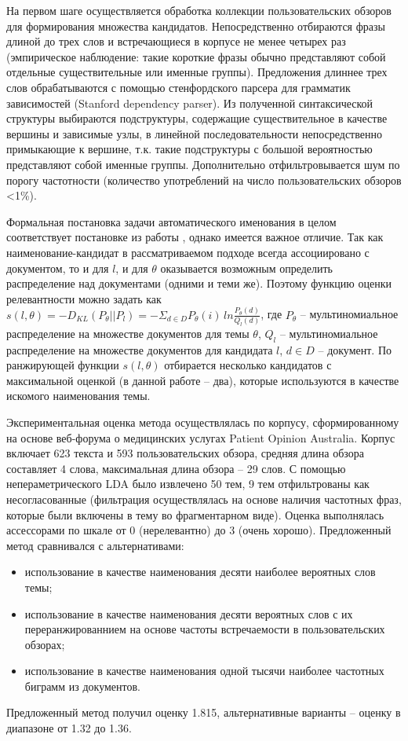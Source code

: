 На первом шаге осуществляется обработка коллекции пользовательских обзоров для формирования множества кандидатов. Непосредственно отбираются фразы длиной до трех слов и встречающиеся в корпусе не менее четырех раз (эмпирическое наблюдение: такие короткие фразы обычно представляют собой отдельные существительные или именные группы). Предложения длиннее трех слов обрабатываются с помощью стенфордского парсера для грамматик зависимостей (Stanford dependency parser). Из полученной синтаксической структуры выбираются подструктуры, содержащие существительное в качестве вершины и зависимые узлы, в линейной последовательности непосредственно примыкающие к вершине, т.к. такие подструктуры с большой вероятностью представляют собой именные группы. Дополнительно отфильтровывается шум по порогу частотности (количество употреблений на число пользовательских обзоров <1\%).

Формальная постановка задачи автоматического именования в целом соответствует постановке из работы \parencite{mei2007automatic}, однако имеется важное отличие. Так как наименование-кандидат в рассматриваемом подходе всегда ассоциировано с документом, то и для $l$, и для $\theta$ оказывается возможным определить распределение над документами (одними и теми же). Поэтому функцию оценки релевантности можно задать как $s(l, \theta) = -D_{KL}(P_\theta||P_l) = -\Sigma_{d \in D}P_\theta(i)\,ln\frac{P_\theta(d)}{Q_l(d)}$, где $P_\theta$ -- мультиномиальное распределение на множестве документов для темы $\theta$, $Q_l$ -- мультиномиальное распределение на множестве документов для кандидата $l$, $d \in D$ -- документ. По ранжирующей функции $s(l, \theta)$ отбирается несколько кандидатов с максимальной оценкой (в данной работе -- два), которые используются в качестве искомого наименования темы.

Экспериментальная оценка метода осуществлялась по корпусу, сформированному на основе веб-форума о медицинских услугах Patient Opinion Australia. Корпус включает 623 текста и 593 пользовательских обзора, средняя длина обзора составляет 4 слова, максимальная длина обзора -- 29 слов. С помощью непераметрического LDA было извлечено 50 тем, 9 тем отфильтрованы как несогласованные (фильтрация осуществлялась на основе наличия частотных фраз, которые были включены в тему во фрагментарном виде). Оценка выполнялась ассессорами по шкале от 0 (нерелевантно) до 3 (очень хорошо). Предложенный метод сравнивался с альтернативами: 
\begin{itemize}
    \item использование в качестве наименования десяти наиболее вероятных слов темы;
    \item использование в качестве наименования десяти вероятных слов с их переранжированнием на основе частоты встречаемости в пользовательских обзорах;
    \item использование в качестве наименования одной тысячи наиболее частотных биграмм из документов.
\end{itemize} 
\noindent Предложенный метод получил оценку 1.815, альтернативные варианты -- оценку в диапазоне от 1.32 до 1.36.

